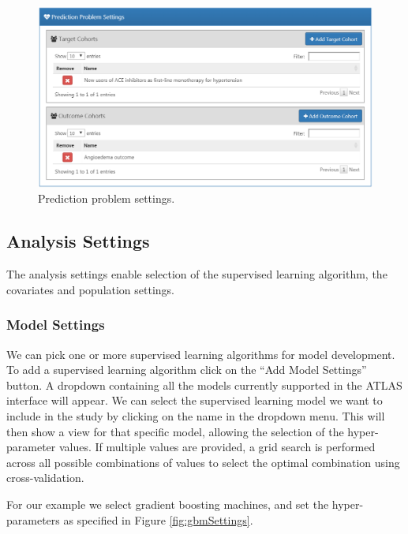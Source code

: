 \documentclass[11pt]{book}
\theoremstyle{definition}
\theoremstyle{definition}
\theoremstyle{definition}
\theoremstyle{remark}
\begin{document}
\begin{figure}

{\centering \includegraphics[width=1\linewidth]{images/PatientLevelPrediction/problemSettings} 

}

\caption{Prediction problem settings.}\label{fig:problemSettings}
\end{figure}

\subsection{Analysis Settings}\label{analysis-settings}

The analysis settings enable selection of the supervised learning
algorithm, the covariates and population settings.

\subsubsection*{Model Settings}\label{model-settings}

We can pick one or more supervised learning algorithms for model
development. To add a supervised learning algorithm click on the ``Add
Model Settings'' button. A dropdown containing all the models currently
supported in the ATLAS interface will appear. We can select the
supervised learning model we want to include in the study by clicking on
the name in the dropdown menu. This will then show a view for that
specific model, allowing the selection of the hyper-parameter values. If
multiple values are provided, a grid search is performed across all
possible combinations of values to select the optimal combination using
cross-validation.

For our example we select gradient boosting machines, and set the
hyper-parameters as specified in Figure \ref{fig:gbmSettings}.
\end{document}
